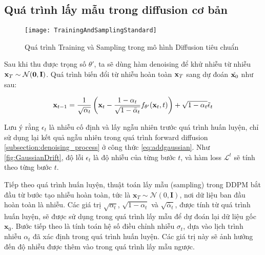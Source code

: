 	
\subsection{Quá trình lấy mẫu trong diffusion cơ bản}
	
		\begin{figure*}
		\centering
		\texttt{[image: TrainingAndSamplingStandard]}
		\caption{Quá trình Training và Sampling trong mô hình Diffusion tiêu chuẩn}
		\label{fig:GaussianDrift}
	\end{figure*}
	

	Sau khi thu được trọng số $\theta'$, ta sẽ dùng hàm denoising để khử nhiễu từ nhiễu $\mathbf{x}_T \sim \mathcal{N} (\mathbf{0}, \mathbf{I})$.
	Quá trình biến đổi từ nhiễu hoàn toàn $\mathbf{x}_{T}$ sang dự đoán $\hat{\mathbf{x}_0}$ như sau:
	
	\begin{equation}
		\label{eq:adddenoising}
	\mathbf{x}_{t-1} = \frac{1}{\sqrt{\alpha_t}} \left( \mathbf{x}_t - \frac{1- \alpha_t}{\sqrt{1 - \bar{\alpha}_t}} f_{\theta'}(\mathbf{x}_t, t) \right) + \sqrt{1 - \alpha_t} \tilde{\epsilon}_t
	\end{equation}
	
Lưu ý rằng $\epsilon_t$ là nhiễu cố định và lấy ngẫu nhiên trước quá trình huấn luyện, chỉ sử dụng lại kết quả ngẫu nhiên trong quá trình forward diffusion \autoref{subsection:denoising_process} ở công thức  \autoref{eq:addgaussian}. Như \autoref{fig:GaussianDrift}, độ lỗi $\epsilon_t$ là độ nhiễu của từng bước $t$, và hàm loss  $\mathcal{L}^{t}$ sẽ tính theo từng bước $t$.


Tiếp theo quá trình huấn luyện, thuật toán lấy mẫu (sampling) trong DDPM bắt đầu từ bước tạo nhiễu hoàn toàn, tức là $\mathbf{x}_T \sim \mathcal{N}(0, \mathbf{I})$, nơi dữ liệu ban đầu hoàn toàn là nhiễu. Các giá trị $\sqrt{\alpha_t}$, $\sqrt{1 - \alpha_t}$ và $\sqrt{\bar{\alpha}_t}$, được tính từ quá trình huấn luyện, sẽ được sử dụng trong quá trình lấy mẫu để dự đoán lại dữ liệu gốc $\mathbf{x}_0$. Bước tiếp theo là tính toán hệ số điều chỉnh nhiễu $\sigma_t$, dựa vào lịch trình nhiễu $\alpha_t$ đã xác định trong quá trình huấn luyện. Các giá trị này sẽ ảnh hưởng đến độ nhiễu được thêm vào trong quá trình lấy mẫu ngược.

